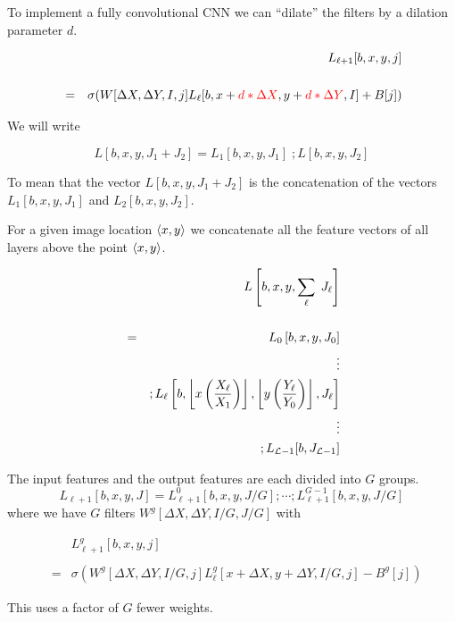 {

To implement a fully convolutional CNN we can ``dilate'' the filters by a dilation parameter $d$.

\vfill
\begin{eqnarray*}
 & & L_{{\ell+1}}[b,x,y,j] \\
 \\
 & = &  \sigma(W[\Delta X, \Delta Y, I, j] L_{{\ell}}[b,x + {\color{red} d*\Delta X}, y + {\color{red} d*\Delta Y}, I] + B[j])
\end{eqnarray*}



We will write

\vfill
$$L[b,x,y,J_1+J_2] = L_1[b,x,y,J_1]\;;L[b,x,y,J_2]$$

\vfill
To mean that the vector $L[b,x,y,J_1+J_2]$ is the concatenation of the vectors $L_1[b,x,y,J_1]$ and $L_2[b,x,y,J_2]$.


For a given image location ${\mbox{$\langle x,y\rangle$}}$ we concatenate all the feature vectors of all layers above the point ${\mbox{$\langle x,y\rangle$}}$.

\vfill
\begin{eqnarray*}
& & L\left[b,x,y,\sum_\ell\;J_\ell\right] \\
\\
& = & L_0\left[b,x,y,J_0\right] \\
 & & \vdots \\
& &  ;L_\ell\left[b,\left\lfloor x\left(\frac{X_\ell}{X_1}\right) \right\rfloor,\left\lfloor y\left(\frac{Y_\ell}{Y_0}\right) \right\rfloor,J_\ell\right] \\
 & & \vdots \\
 & & ;L_{{\cal L}-1}[b,J_{{\cal L}-1}]
\end{eqnarray*}


The input features and the output features are each divided into $G$ groups.
$$L_{\ell+1}[b,x,y,J] = L^0_{\ell+1}[b,x,y,J/G];\cdots;L^{G-1}_{\ell+1}[b,x,y,J/G]$$
where we have $G$ filters $W^g[\Delta X, \Delta Y,I/G,J/G]$ with

\begin{eqnarray*}
 & & L^g_{{\ell+1}}[b,x,y,j] \\
 \\
 & = & \sigma(W^g[\Delta X, \Delta Y,I/G,j]L_\ell^g[x+\Delta X,y+\Delta Y,I/G,j] - B^g[j])
 \end{eqnarray*}

\vfill
This uses a factor of $G$ fewer weights.

}
